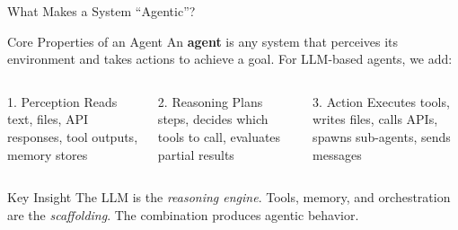\documentclass[aspectratio=169,xcolor=dvipsnames]{beamer}
\begin{document}
\begin{frame}{What Makes a System ``Agentic''?}
    \begin{block}{Core Properties of an Agent}
        An \textbf{agent} is any system that perceives its environment and takes actions to achieve a goal. For LLM-based agents, we add:
    \end{block}

    \begin{columns}
        \begin{exampleblock}{1. Perception}
            \centering
            Reads text, files, API responses, tool outputs, memory stores
        \end{exampleblock}

        \begin{exampleblock}{2. Reasoning}
            \centering
            Plans steps, decides which tools to call, evaluates partial results
        \end{exampleblock}

        \begin{exampleblock}{3. Action}
            \centering
            Executes tools, writes files, calls APIs, spawns sub-agents, sends messages
        \end{exampleblock}
    \end{columns}

    \vspace{0.3cm}
    \begin{alertblock}{Key Insight}
        The LLM is the \emph{reasoning engine}. Tools, memory, and orchestration are the \emph{scaffolding}. The combination produces agentic behavior.
    \end{alertblock}
\end{frame}
\end{document}
